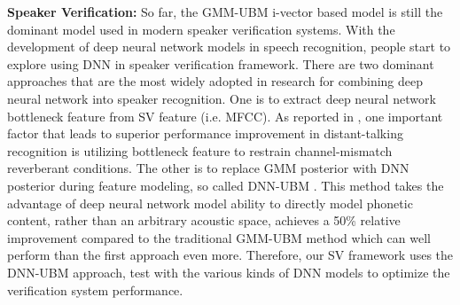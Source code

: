 \noindent \textbf{Speaker Verification:} So far, the GMM-UBM i-vector based model \cite{dehak2011front} is still the dominant model used in modern speaker verification systems. With the development of deep neural network models in speech recognition, people start to explore using DNN in speaker verification framework. There are two dominant approaches that are the most widely adopted in research for combining deep neural network into speaker recognition. One is to extract deep neural network bottleneck feature from SV feature (i.e. MFCC). As reported in \cite{yamada2013improvement}, one important factor that leads to superior performance improvement in distant-talking recognition is utilizing bottleneck feature to restrain channel-mismatch reverberant conditions. The other is to replace GMM posterior with DNN posterior during feature modeling, so called DNN-UBM \cite{Snyder2016Time, mclaren2015advances, saleem2016discriminative}. This method takes the advantage of deep neural network model ability to directly model phonetic content, rather than an arbitrary acoustic space, achieves a 50\% relative improvement compared to the traditional GMM-UBM method which can well perform than the first approach even more. Therefore, our SV framework uses the DNN-UBM approach, test with the various kinds of DNN models to optimize the verification system performance.
